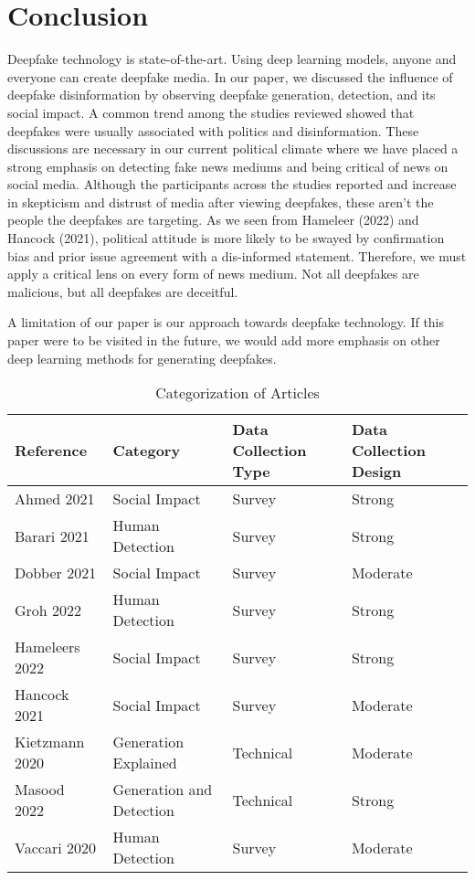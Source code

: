\documentclass[
  journal=small,
  manuscript=article-type,  %
  year=2020,
  volume=37,
]{cup-journal}
\begin{document}
\section{Conclusion}
Deepfake technology is state-of-the-art. Using deep learning models, anyone and everyone can create deepfake media. In our paper, we discussed the influence of deepfake disinformation by observing deepfake generation, detection, and its social impact. A common trend among the studies reviewed showed that deepfakes were usually associated with politics and disinformation. These discussions are necessary in our current political climate where we have placed a strong emphasis on detecting fake news mediums and being critical of news on social media. Although the participants across the studies reported and increase in skepticism and distrust of media after viewing deepfakes, these aren't the people the deepfakes are targeting. As we seen from Hameleer (2022) and Hancock (2021), political attitude is more likely to be swayed by confirmation bias and prior issue agreement with a dis-informed statement. Therefore, we must apply a critical lens on every form of news medium. Not all deepfakes are malicious, but all deepfakes are deceitful. 

A limitation of our paper is our approach towards deepfake technology. If this paper were to be visited in the future, we would add more emphasis on other deep learning methods for generating deepfakes.  

\begin{table}[hbt!]
\begin{threeparttable}
\caption{Categorization of Articles}
\label{deepfake_type}
\begin{tabular}{llll}
\toprule
\headrow Reference & Category & Data Collection Type & Data Collection Design  \\
\midrule
Ahmed 2021 & Social Impact & Survey & Strong\\ 
\midrule
Barari 2021 & Human Detection & Survey & Strong\\ 
\midrule
Dobber 2021 & Social Impact & Survey & Moderate\\ 
\midrule
Groh 2022 & Human Detection & Survey & Strong\\ 
\midrule
Hameleers 2022 & Social Impact & Survey & Strong\\ 
\midrule
Hancock 2021 & Social Impact & Survey & Moderate\\ 
\midrule
Kietzmann 2020 & Generation Explained & Technical & Moderate\\ 
\midrule
Masood 2022 & Generation and Detection & Technical & Strong\\ 
\midrule
Vaccari 2020 & Human Detection & Survey & Moderate\\ 
\bottomrule
\end{tabular}
\end{threeparttable}
\end{table}
\end{document}
